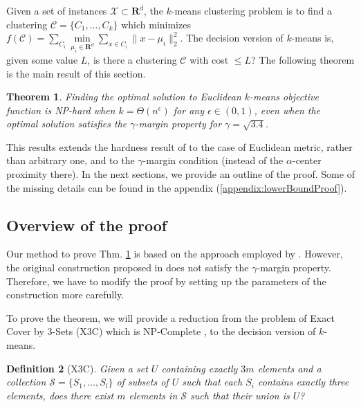 \documentclass[12pt]{article}
\newcommand{\mc}{\mathcal}
\newcommand{\mb}{\mathbf}
\newtheorem{theorem}{Theorem}
\newtheorem{definition}[theorem]{Definition}
\begin{document}
Given a set of instances $\mc X \subset \mb R ^d$, the $k$-means clustering problem is to find a clustering $\mc C = \{C_1, \ldots, C_k\}$ which minimizes $f(\mc C) = \sum\limits_{C_i} \min\limits_{\mu_i\in {\mb R}^d}\sum\limits_{x\in C_i} \|x - \mu_i \|_2^2$. The decision version of $k$-means is, given some value $L$, is there a clustering $\mc C$ with cost $\le L$? The following theorem is the main result of this section. 

\begin{theorem}
\label{thm:gammaLower}
Finding the optimal solution to Euclidean $k$-means objective function is NP-hard when $k=\Theta(n^\epsilon)$ for any $\epsilon \in (0,1)$, even when the optimal solution satisfies the $\gamma$-margin property for $\gamma = \sqrt{3.4}$.
\end{theorem}

This results extends the hardness result of \cite{ben2014data} to the case of Euclidean 
metric, rather than arbitrary one, and to the $\gamma$-margin condition (instead of the $\alpha$-center proximity there). In the next sections, we provide an outline of the proof. Some of the missing details can be found in the appendix (\ref{appendix:lowerBoundProof}).

\subsection{Overview of the proof}

Our method to prove Thm. \ref{thm:gammaLower} is based on the approach employed by \cite{vattani2009hardness}. However, the original construction proposed in \cite{vattani2009hardness} does not satisfy the $\gamma$-margin property. Therefore, we have to modify the proof by setting up the parameters of the construction more carefully. 

To prove the theorem, we will provide a reduction from the problem of Exact Cover by 3-Sets (\textsc{X3C}) which is NP-Complete \cite{garey2002computers}, to the decision version of $k$-means.

\begin{definition}[\textsc{X3C}]
Given a set $U$ containing exactly $3m$ elements and a collection $\mc S = \{S_1, \ldots, S_l\}$ of subsets of $U$ such that each $S_i$ contains exactly three elements, does there exist $m$ elements in $\mc S$ such that their union is $U$? 
\end{definition}
\end{document}
